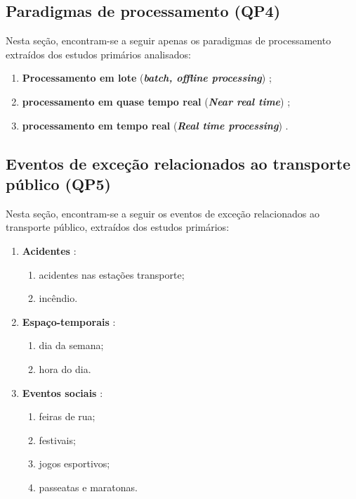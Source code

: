 \documentclass[
	12pt,				%
	oneside,			%
	a4paper,			%
	english,			%
	brazil				%
	]{abntex2ppgsi}
\begin{document}
{{\subsection{Paradigmas de processamento (QP4)}
Nesta seção, encontram-se a seguir apenas os paradigmas de processamento extraídos dos estudos primários analisados: 
\begin{enumerate}
\item \textbf{Processamento em lote} (\textit{\textbf{batch, offline processing}}) \cite{Anantharam2015, Wen2016, Farseev2015, Gutev2016, Mata2015, Chen2016, Abbasi2015, Bendler2014, Yousaf2014, Frias-Martinez2014, Steiger2015Census, Gal-Tzur2014, Gkiotsalitis2016, DiLorenzo2013, Itoh2016, Chaniotakis2015};
\item \textbf{processamento em quase tempo real} (\textit{\textbf{Near real time}}) \cite{Mukherjee2015};
\item \textbf{processamento em tempo real} (\textit{\textbf{Real time processing}}) \cite{Soomro2016, Lecue2014}.
\end{enumerate}

\subsection{Eventos de exceção relacionados ao transporte público (QP5)}
\label{qp5}

Nesta seção, encontram-se a seguir os eventos de exceção relacionados ao transporte público, extraídos dos estudos primários:

\begin{enumerate}
\item \textbf{Acidentes} \cite{Itoh2016}:
\begin{enumerate}
\item acidentes nas estações transporte;
\item incêndio.
\end{enumerate}

\item \textbf{Espaço-temporais}  \cite{Chen2016}:
\begin{enumerate}
\item dia da semana;
\item hora do dia.
\end{enumerate}

\item \textbf{Eventos sociais} \cite{Chen2016, Lecue2014, Gal-Tzur2014, Itoh2016}:
\begin{enumerate}
\item feiras de rua;
\item festivais;
\item jogos esportivos;
\item passeatas e maratonas.
\end{enumerate}


\end{enumerate}}}
\end{document}
